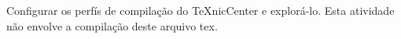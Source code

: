 Configurar os perfís de compilação do TeXnicCenter e explorá-lo.
Esta atividade não envolve a compilação deste arquivo tex.